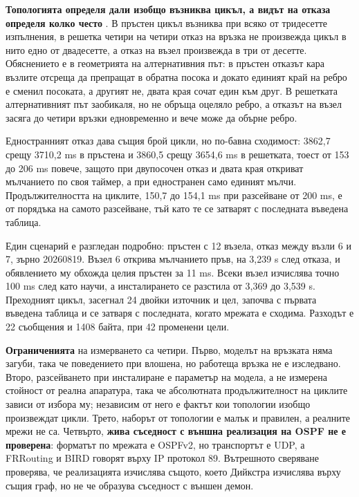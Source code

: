 \textbf{Топологията определя дали изобщо възниква цикъл, а видът на отказа определя колко
често} . В пръстен цикъл възниква при всяко от тридесетте изпълнения, в
решетка четири на четири отказ на връзка не произвежда цикъл в нито едно от двадесетте, а
отказ на възел произвежда в три от десетте. Обяснението е в геометрията на алтернативния път: в
пръстен отказът кара възлите отсреща да препращат в обратна посока и докато единият край на
ребро е сменил посоката, а другият не, двата края сочат един към друг. В решетката
алтернативният път заобикаля, но не обръща оцеляло ребро, а отказът на възел засяга до четири
връзки едновременно и вече може да обърне ребро.

Едностранният отказ дава същия брой цикли, но по-бавна сходимост: 3862,7 срещу 3710,2 ms в
пръстена и 3860,5 срещу 3654,6 ms в решетката, тоест от 153 до 206 ms повече, защото при
двупосочен отказ и двата края откриват мълчанието по своя таймер, а при едностранен само
единият мълчи. Продължителността на циклите, 150,7 до 154,1 ms при разсейване от 200 ms, е от
порядъка на самото разсейване, тъй като те се затварят с последната въведена таблица.

Един сценарий е разгледан подробно: пръстен с 12 възела, отказ между възли 6 и 7, зърно
20260819. Възел 6 открива мълчанието пръв, на 3,239 s след отказа, и обявлението му обхожда
целия пръстен за 11 ms. Всеки възел изчислява точно 100 ms след като научи, а инсталирането се
разстила от 3,369 до 3,539 s. Преходният цикъл, засегнал 24 двойки източник и цел, започва с
първата въведена таблица и се затваря с последната, когато мрежата е сходима. Разходът е 22
съобщения и 1408 байта, при 42 променени цели.

\textbf{Ограниченията} на измерването са четири. Първо, моделът на връзката няма загуби, така
че поведението при влошена, но работеща връзка не е изследвано. Второ, разсейването при
инсталиране е параметър на модела, а не измерена стойност от реална апаратура, така че
абсолютната продължителност на циклите зависи от избора му; независим от него е фактът кои
топологии изобщо произвеждат цикли. Трето, наборът от топологии е малък и правилен, а реалните
мрежи не са. Четвърто, \textbf{жива съседност с външна реализация на OSPF не е проверена}:
форматът по мрежата е OSPFv2, но транспортът е UDP, а FRRouting и BIRD говорят върху IP
протокол 89. Вътрешното сверяване проверява, че реализацията изчислява същото, което Дийкстра
изчислява върху същия граф, но не че образува съседност с външен демон.
